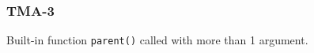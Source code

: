 \subsubsection{TMA-3}\label{sec:error_code_tma_3}

Built-in function \texttt{parent()} called with more than 1 argument.


